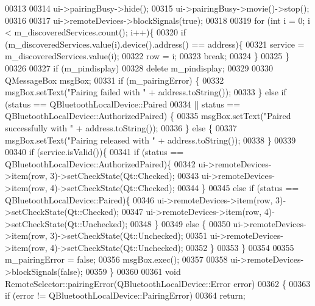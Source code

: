 \begin{DoxyCode}
{{00313 
00314     ui->pairingBusy->hide();
00315     ui->pairingBusy->movie()->stop();
00316 
00317     ui->remoteDevices->blockSignals(\textcolor{keyword}{true});
00318 
00319     \textcolor{keywordflow}{for} (\textcolor{keywordtype}{int} i = 0; i < m\_discoveredServices.count(); i++)\{
00320         \textcolor{keywordflow}{if} (m\_discoveredServices.value(i).device().address() == address)\{
00321             service = m\_discoveredServices.value(i);
00322             row = i;
00323             \textcolor{keywordflow}{break};
00324         \}
00325     \}
00326 
00327     \textcolor{keywordflow}{if} (m\_pindisplay)
00328         \textcolor{keyword}{delete} m\_pindisplay;
00329 
00330     QMessageBox msgBox;
00331     \textcolor{keywordflow}{if} (m\_pairingError) \{
00332         msgBox.setText(\textcolor{stringliteral}{"Pairing failed with "} + address.toString());
00333     \} \textcolor{keywordflow}{else} \textcolor{keywordflow}{if} (status == QBluetoothLocalDevice::Paired
00334                || status == QBluetoothLocalDevice::AuthorizedPaired) \{
00335         msgBox.setText(\textcolor{stringliteral}{"Paired successfully with "} + address.toString());
00336     \} \textcolor{keywordflow}{else} \{
00337         msgBox.setText(\textcolor{stringliteral}{"Pairing released with "} + address.toString());
00338     \}
00339 
00340     \textcolor{keywordflow}{if} (service.isValid())\{
00341         \textcolor{keywordflow}{if} (status == QBluetoothLocalDevice::AuthorizedPaired)\{
00342             ui->remoteDevices->item(row, 3)->setCheckState(Qt::Checked);
00343             ui->remoteDevices->item(row, 4)->setCheckState(Qt::Checked);
00344         \}
00345         \textcolor{keywordflow}{else} \textcolor{keywordflow}{if} (status == QBluetoothLocalDevice::Paired)\{
00346             ui->remoteDevices->item(row, 3)->setCheckState(Qt::Checked);
00347             ui->remoteDevices->item(row, 4)->setCheckState(Qt::Unchecked);
00348         \}
00349         \textcolor{keywordflow}{else} \{
00350             ui->remoteDevices->item(row, 3)->setCheckState(Qt::Unchecked);
00351             ui->remoteDevices->item(row, 4)->setCheckState(Qt::Unchecked);
00352         \}
00353     \}
00354 
00355     m\_pairingError = \textcolor{keyword}{false};
00356     msgBox.exec();
00357 
00358     ui->remoteDevices->blockSignals(\textcolor{keyword}{false});
00359 \}
00360 
00361 \textcolor{keywordtype}{void} RemoteSelector::pairingError(QBluetoothLocalDevice::Error error)
00362 \{
00363     \textcolor{keywordflow}{if} (error != QBluetoothLocalDevice::PairingError)
00364         \textcolor{keywordflow}{return};
}}
\end{DoxyCode}
